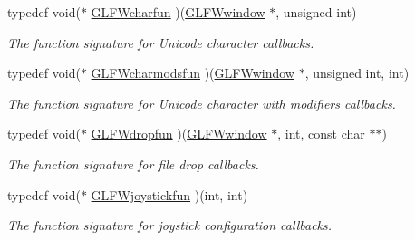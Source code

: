 \begin{CompactItemize}
typedef void($\ast$ \hyperlink{group__input_g1103f1876518acecb5976f6b307c51d1}{GLFWcharfun} )(\hyperlink{group__window_g3c96d80d363e67d13a41b5d1821f3242}{GLFWwindow} $\ast$, unsigned int)
\begin{CompactList}\small\item\em The function signature for Unicode character callbacks. \item\end{CompactList}\item 
typedef void($\ast$ \hyperlink{group__input_g3826e9cf33f760c1480d6ce873f9d002}{GLFWcharmodsfun} )(\hyperlink{group__window_g3c96d80d363e67d13a41b5d1821f3242}{GLFWwindow} $\ast$, unsigned int, int)
\begin{CompactList}\small\item\em The function signature for Unicode character with modifiers callbacks. \item\end{CompactList}\item 
typedef void($\ast$ \hyperlink{group__input_gcc95e259ad21d4f666faa6280d4018fd}{GLFWdropfun} )(\hyperlink{group__window_g3c96d80d363e67d13a41b5d1821f3242}{GLFWwindow} $\ast$, int, const char $\ast$$\ast$)
\begin{CompactList}\small\item\em The function signature for file drop callbacks. \item\end{CompactList}\item 
typedef void($\ast$ \hyperlink{group__input_g488fd02f577e56f908a8f305dd226dbf}{GLFWjoystickfun} )(int, int)
\begin{CompactList}\small\item\em The function signature for joystick configuration callbacks. \item\end{CompactList}\end{CompactItemize}
